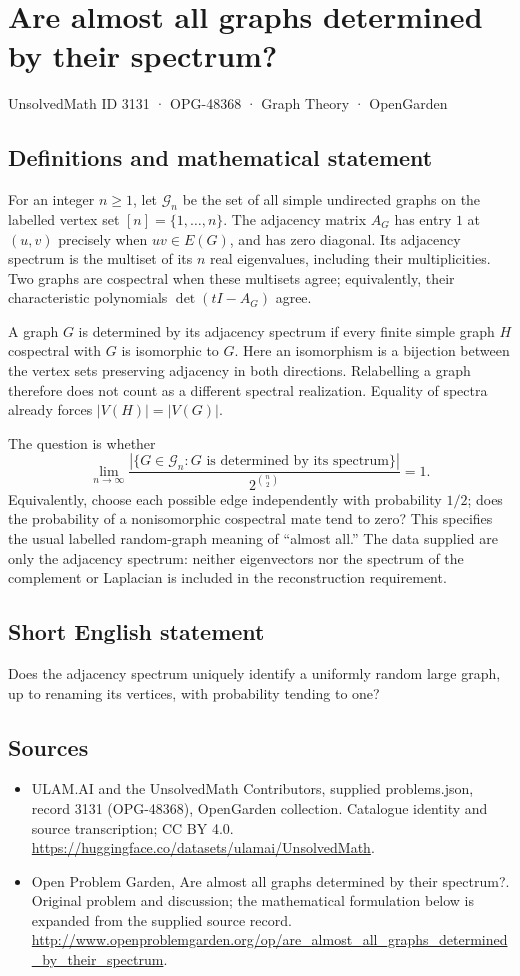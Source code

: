 \documentclass[11pt,a4paper]{article}
\begin{document}
\section*{Are almost all graphs determined by their spectrum?}\label{3131}
{\small UnsolvedMath ID 3131 · OPG-48368 · Graph Theory · OpenGarden}
\subsection{Definitions and mathematical statement}
For an integer $n\geq1$, let $\mathcal G_n$ be the set of all simple
undirected graphs on the labelled vertex set $[n]=\{1,\ldots,n\}$.
The adjacency matrix $A_G$ has entry $1$ at $(u,v)$ precisely when
$uv\in E(G)$, and has zero diagonal. Its adjacency spectrum is the
multiset of its $n$ real eigenvalues, including their multiplicities.
Two graphs are cospectral when these multisets agree; equivalently,
their characteristic polynomials $\det(tI-A_G)$ agree.

A graph $G$ is determined by its adjacency spectrum if every finite
simple graph $H$ cospectral with $G$ is isomorphic to $G$. Here an
isomorphism is a bijection between the vertex sets preserving adjacency
in both directions. Relabelling a graph therefore does not count as a
different spectral realization. Equality of spectra already forces
$|V(H)|=|V(G)|$.

The question is whether
\[
 \lim_{n\to\infty}
 \frac{|\{G\in\mathcal G_n:G\text{ is determined by its spectrum}\}|}
 {2^{\binom n2}}=1.
\]
Equivalently, choose each possible edge independently with probability
$1/2$; does the probability of a nonisomorphic cospectral mate tend to
zero? This specifies the usual labelled random-graph meaning of
``almost all.'' The data supplied are only the adjacency spectrum:
neither eigenvectors nor the spectrum of the complement or Laplacian
is included in the reconstruction requirement.
\subsection{Short English statement}
Does the adjacency spectrum uniquely identify a uniformly random large graph, up to renaming its vertices, with probability tending to one?
\subsection{Sources}
\begin{itemize}
\item[S1] ULAM.AI and the UnsolvedMath Contributors, supplied problems.json, record 3131 (OPG-48368), OpenGarden collection. Catalogue identity and source transcription; CC BY 4.0.
\url{https://huggingface.co/datasets/ulamai/UnsolvedMath}.
\item[S2] Open Problem Garden, Are almost all graphs determined by their spectrum?. Original problem and discussion; the mathematical formulation below is expanded from the supplied source record.
\url{http://www.openproblemgarden.org/op/are_almost_all_graphs_determined_by_their_spectrum}.
\end{itemize}
\end{document}

